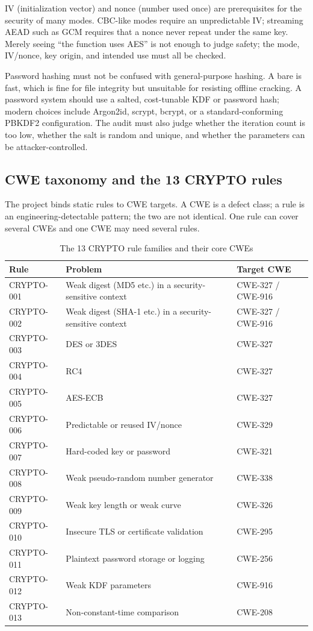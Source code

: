 \documentclass[11pt]{article}
\newcommand{\code}[1]{\texttt{\detokenize{#1}}}
\begin{document}
IV (initialization vector) and nonce (number used once) are prerequisites for the security of many modes.
CBC-like modes require an unpredictable IV; streaming AEAD such as GCM requires that a nonce never repeat
under the same key. Merely seeing ``the function uses AES'' is not enough to judge safety; the mode, IV/nonce,
key origin, and intended use must all be checked.

Password hashing must not be confused with general-purpose hashing. A bare \code{sha256(password)} is fast,
which is fine for file integrity but unsuitable for resisting offline cracking. A password system should use
a salted, cost-tunable KDF or password hash; modern choices include Argon2id, scrypt, bcrypt, or a
standard-conforming PBKDF2 configuration. The audit must also judge whether the iteration count is too low,
whether the salt is random and unique, and whether the parameters can be attacker-controlled.

\subsection{CWE taxonomy and the 13 CRYPTO rules}

The project binds static rules to CWE targets. A CWE is a defect class; a rule is an engineering-detectable
pattern; the two are not identical. One rule can cover several CWEs and one CWE may need several rules.

\begin{table}[h]
\centering
\caption{The 13 CRYPTO rule families and their core CWEs}
\label{tab:cwe13-en}
\small
\begin{tabularx}{\linewidth}{L{2.35cm}Y L{2.35cm}}
\toprule
\textbf{Rule} & \textbf{Problem} & \textbf{Target CWE} \\
\midrule
CRYPTO-001 & Weak digest (MD5 etc.) in a security-sensitive context & CWE-327 / CWE-916 \\
CRYPTO-002 & Weak digest (SHA-1 etc.) in a security-sensitive context & CWE-327 / CWE-916 \\
CRYPTO-003 & DES or 3DES & CWE-327 \\
CRYPTO-004 & RC4 & CWE-327 \\
CRYPTO-005 & AES-ECB & CWE-327 \\
CRYPTO-006 & Predictable or reused IV/nonce & CWE-329 \\
CRYPTO-007 & Hard-coded key or password & CWE-321 \\
CRYPTO-008 & Weak pseudo-random number generator & CWE-338 \\
CRYPTO-009 & Weak key length or weak curve & CWE-326 \\
CRYPTO-010 & Insecure TLS or certificate validation & CWE-295 \\
CRYPTO-011 & Plaintext password storage or logging & CWE-256 \\
CRYPTO-012 & Weak KDF parameters & CWE-916 \\
CRYPTO-013 & Non-constant-time comparison & CWE-208 \\
\bottomrule
\end{tabularx}
\end{table}
\end{document}
